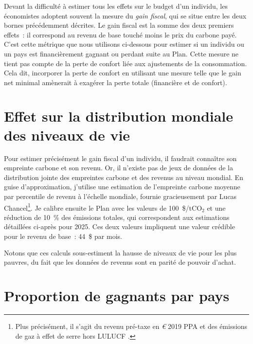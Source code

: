 \documentclass[a5paper,french,openany]{memoir}
\begin{document}
Devant la difficulté à estimer tous les effets sur le budget d'un individu, les économistes adoptent souvent la mesure du \textit{gain fiscal}, qui se situe entre les deux bornes précédemment décrites. Le gain fiscal est la somme des deux premiers effets~: il correspond au revenu de base touché moins le prix du carbone payé. C'est cette métrique que nous utilisons ci-dessous pour estimer si un individu ou un pays est financièrement gagnant ou perdant suite au Plan. Cette mesure ne tient pas compte de la perte de confort liée aux ajustements de la consommation. Cela dit, incorporer la perte de confort en utilisant une mesure %
telle que le gain net minimal amènerait à exagérer la perte totale (financière et de confort).

\section{Effet sur la distribution mondiale des niveaux de vie}\label{app:revenus}

Pour estimer précisément le gain fiscal d'un individu, il faudrait connaître son empreinte carbone et son revenu. Or, il n'existe pas de jeux de données de la distribution jointe des empreintes carbone et des revenus au niveau mondial. En guise d'approximation, j'utilise une estimation de l'empreinte carbone moyenne par percentile de revenu à l'échelle mondiale, fournie gracieusement par Lucas Chancel\footnote{Plus précisément, il s'agit du revenu pré-taxe en \textit{\euro{}} 2019 PPA et des émissions de gaz à effet de serre hors LULUCF
.}. Je calibre ensuite le Plan avec les valeurs de 100~\$/tCO$_\text{2}$ et une réduction de 10~\% des émissions totales, qui correspondent aux estimations détaillées ci-après pour 2025. Ces deux valeurs impliquent une valeur crédible pour le revenu de base~: 44~\$ par mois. 

Notons que ces calculs sous-estiment la hausse de niveaux de vie pour les plus pauvres, du fait que les données de revenus sont en parité de pouvoir d'achat.

\section{Proportion de gagnants par pays}
\end{document}
